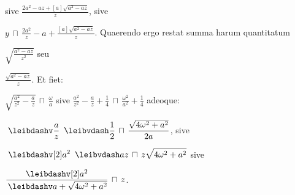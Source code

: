 sive 
$\displaystyle \frac{2a^2 -az + [a] \sqrt{a^2 - az}}{z}$,
sive
\rule[-4mm]{0mm}{10mm}$\displaystyle y \, \sqcap \, \frac{2a^2}{z} - a + \frac{[a] \sqrt{a^2 - az}}{z}$.
\pend
\pstart
Quaerendo ergo restat summa harum quantitatum 
\rule[-4mm]{0mm}{10mm}$\displaystyle \sqrt{\frac{a^2 - az}{z^2}}$ 
seu 
\rule[-4mm]{0mm}{10mm}$\displaystyle \frac{\sqrt{a^2 - az}}{z}$. 
Et fiet: 
\rule[-4mm]{0mm}{10mm}$\displaystyle \sqrt{\frac{a^2}{z^2} - \frac{a}{z}} \, \sqcap \, \frac{\omega}{a}$ sive $\displaystyle \frac{a^2}{z^2} - \frac{a}{z} + \frac{1}{4} \, \sqcap \, \frac{\omega ^2}{a^2} + \frac{1}{4}$ 
adeoque: 
\rule[-4mm]{0mm}{10mm}$\displaystyle\ \leibdashv \frac{a}{z} \ \, \leibvdash \frac{1}{2} \, \sqcap \, \frac{\sqrt{4\omega ^2 + a^2}}{2a}$, 
sive 
\rule[-4mm]{0mm}{10mm}$\displaystyle\ \leibdashv [2]a^2 \ \, \leibvdash az \, \sqcap \, z \sqrt{4\omega ^2 + a^2}$
sive 
\rule[-4mm]{0mm}{10mm}$\displaystyle \frac{\leibdashv [2]a^2}{\, \leibdashv a + \sqrt{4\omega ^2 + a^2}} \, \sqcap \, z$.%
